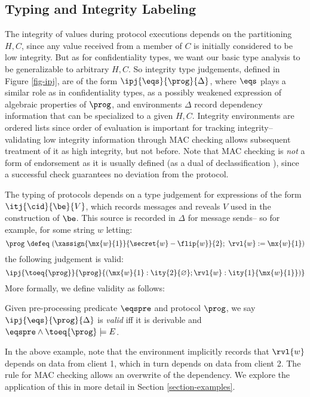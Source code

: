 \subsection{Typing and Integrity Labeling}

The integrity of values during protocol executions depends on the
partitioning $H,C$, since any value received from a member of $C$ is
initially considered to be low integrity. But as for confidentiality
types, we want our basic type analysis to be generalizable to
arbitrary $H,C$. So integrity type judgements, defined in Figure
\ref{fig-ipj}, are of the form $\ipj{\eqs}{\prog}{\Delta}$, where
$\eqs$ plays a similar role as in confidentiality types, as a possibly
weakened expression of algebraic properties of $\prog$, and
environments $\Delta$ record dependency information that can be
specialized to a given $H,C$. Integrity environments are ordered lists
since order of evaluation is important for tracking integrity--
validating low integrity information through MAC checking allows
subsequent treatment of it as high integrity, but not before. Note
that MAC checking is \emph{not} a form of endorsement as it is usually
defined (as a dual of declassification
\cite{sabelfeld2009declassification}), since a successful check
guarantees no deviation from the protocol.

The typing of protocols depends on a type judgement for expressions
of the form $\itj{\cid}{\be}{V}$, which records
messages and reveals $V$ used in the construction of $\be$.
This source is recorded in $\Delta$ for message sends-- so for
example, for some string $w$ letting:
$$
\prog\ \defeq\ (\xassign{\mx{w}{1}}{\secret{w} - \flip{w}}{2};\ \rvl{w} := \mx{w}{1})
$$
the following judgement is valid:
$$
\ipj{\toeq{\prog}}{\prog}{(\mx{w}{1} : \ity{2}{\varnothing}; \rvl{w} : \ity{1}{\mx{w}{1}})}
$$
More formally, we define validity as follows:
\begin{definition}
  Given pre-processing predicate $\eqspre$ and protocol $\prog$, 
  we say $\ipj{\eqs}{\prog}{\Delta}$ is \emph{valid}
  iff it is derivable and $\eqspre \wedge \toeq{\prog} \models E$.
\end{definition}

In the above example, note that the environment implicitly records
that $\rvl{w}$ depends on data from client 1, which in turn
depends on data from client 2. The rule for MAC
checking allows an overwrite of the dependency. We explore
the application of this in more detail in Section
\ref{section-examples}.

